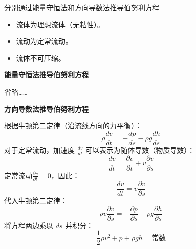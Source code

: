 \documentclass[12pt, a4paper, oneside, UTF8]{ctexbook}  %
\begin{document}
\begin{example}
    分别通过能量守恒法和方向导数法推导伯努利方程
    \begin{yzh}
        \begin{itemize}
            \item 流体为理想流体（无粘性）。
            \item 流动为定常流动。
            \item 流体不可压缩。
        \end{itemize}
    \end{yzh}
    \begin{tui}
        \begin{center}
            \textbf{能量守恒法推导伯努利方程}
        \end{center}
省略……
        \begin{center}
            \textbf{方向导数法推导伯努利方程}
        \end{center}
        根据牛顿第二定律（沿流线方向的力平衡）：
\[
\rho \frac{dv}{dt} = -\frac{dp}{ds} - \rho g \frac{dh}{ds}
\]
对于定常流动，加速度 \( \frac{dv}{dt} \) 可以表示为随体导数（物质导数）：
\[
\frac{dv}{dt} = \frac{\partial v}{\partial t} + v \frac{\partial v}{\partial s}
\]
定常流动\( \frac{\partial v}{\partial t} = 0 \)，因此：
\[
\frac{dv}{dt} = v \frac{\partial v}{\partial s}
\]
代入牛顿第二定律：
\[
\rho v \frac{\partial v}{\partial s} = -\frac{\partial p}{\partial s} - \rho g \frac{\partial h}{\partial s}
\]
将方程两边乘以 \( ds \) 并积分：
\[
\frac{1}{2} \rho v^2 + p + \rho g h = \text{常数}
\]
    \end{tui}
\end{example}

\ifx\allfiles\undefined
\end{document}
